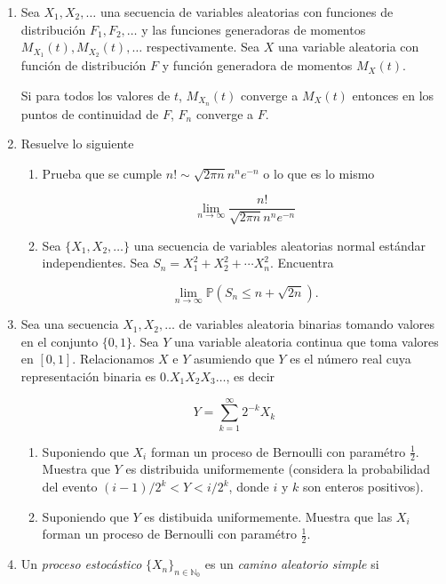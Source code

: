 \documentclass[a4paper,11pt]{report}
\begin{document}
\begin{enumerate}
\item Sea $X_1, X_2, \dots $ una secuencia de variables aleatorias con funciones de distribuci\'on $F_1, F_2, \dots$ y las funciones generadoras de momentos $M_{X_1}(t), M_{X_2}(t), \dots$ respectivamente. Sea $X$ una variable aleatoria con funci\'on de distribuci\'on $F$ y funci\'on generadora de momentos $M_X(t)$.

Si para todos los valores de $t$, $M_{X_n}(t)$ converge a $M_{X}(t)$ entonces en los puntos de continuidad de $F$, $F_n$ converge a $F$.



\item Resuelve lo siguiente

\begin{enumerate}
	\item Prueba que se cumple  $n! \sim \sqrt{2\pi n}n^ne^{-n}$ o lo que es lo mismo
	
	\[
	\lim_{n \rightarrow \infty}\dfrac{n!}{\sqrt{2\pi n}n^ne^{-n}}
	\]
	
	\item Sea $\{X_1, X_2, \dots  \}$ una secuencia de variables aleatorias normal est\'andar independientes. Sea $S_n = X_1^2 + X_2^2 + \cdots X_n^2$. Encuentra
	
	\[
	\lim_{n \rightarrow \infty}\mathbb{P}(S_n \leq n + \sqrt{2n}).
	\] 
\end{enumerate}
\item Sea una secuencia $X_1, X_2, \dots$ de variables aleatoria binarias tomando valores en el conjunto $\{0, 1\}$. Sea $Y$ una variable aleatoria continua que toma valores en $[0, 1]$. Relacionamos $X$ e $Y$ asumiendo que $Y$ es el n\'umero real cuya representaci\'on binaria es $0.X_1X_2X_3\dots$, es decir

\[
Y = \sum_{k = 1}^{\infty}2^{-k}X_k
\]

\begin{enumerate}
	\item Suponiendo que $X_i$ forman un proceso de Bernoulli con param\'etro $\frac{1}{2}$. Muestra que $Y$ es distribuida uniformemente (considera la probabilidad del evento $(i - 1)/2^k < Y < i/2^k$, donde $i$ y $k$ son enteros positivos).
	\item Suponiendo que $Y$ es distibuida uniformemente. Muestra que las $X_i$ forman un proceso de Bernoulli con param\'etro $\frac{1}{2}$.
\end{enumerate}
\item  Un \textit{proceso estoc\'astico} $\{ X_n\}_{n \in \mathbb{N}_0}$ es un \textit{camino aleatorio simple} si


\end{enumerate}
\end{document}
